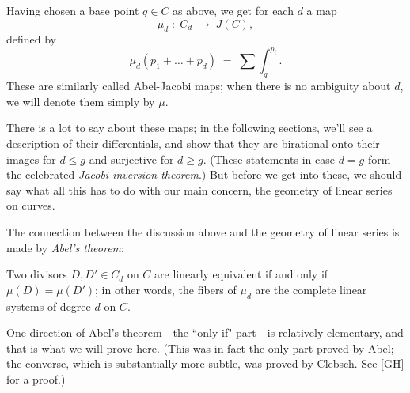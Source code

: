 %

Having chosen a base point $q \in C$ as above, we get for each $d$ a map
$$
\mu_d \; : \; C_d \; \to \; J(C),
$$
defined by
$$
\mu_d(p_1 + \dots + p_d) \; = \; \sum \int_q^{p_i}.
$$
These are similarly called  Abel-Jacobi maps; when there is no ambiguity about $d$, we will denote them simply by $\mu$.

There is a lot to say about these maps; in the following sections, we'll see a description of their differentials, and show that they are birational onto their images for $d \leq g$ and surjective for $d \geq g$. (These statements in case $d=g$ form the celebrated \emph{Jacobi inversion theorem}.) But before we get into these, we should say what all this has to do with our main concern, the geometry of linear series on curves.

The connection between the discussion above and the geometry of linear series is made by \emph{Abel's theorem}:

\begin{theorem}
Two divisors $D, D' \in C_d$ on $C$ are linearly equivalent if and only if $\mu(D) = \mu(D')$; in other words, the fibers of $\mu_d$ are the complete linear systems of degree $d$ on $C$.
\end{theorem}

One direction of Abel's theorem---the ``only if" part---is relatively elementary, and that is what we will prove here. (This was in fact the only part proved by Abel; the converse, which is substantially more subtle, was proved by Clebsch. See \cite{} [GH] for a proof.)


